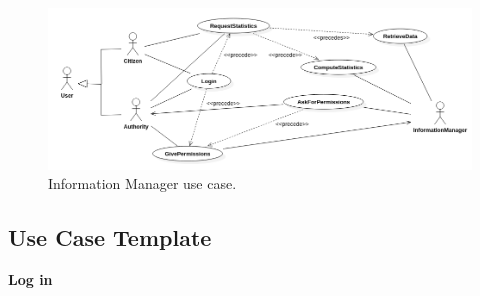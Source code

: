 \documentclass{report}
\begin{document}
\begin{figure}[ht!]
\begin{center}
\includegraphics[scale=0.35]{./img/UseCase3.png}
\end{center}
\caption{Information Manager use case.}
\label{fig:UseCase3}
\end{figure}
\newpage
\subsection{Use Case Template}
\begin{center}
	\textbf{Log in}
\end{center}
\end{document}
